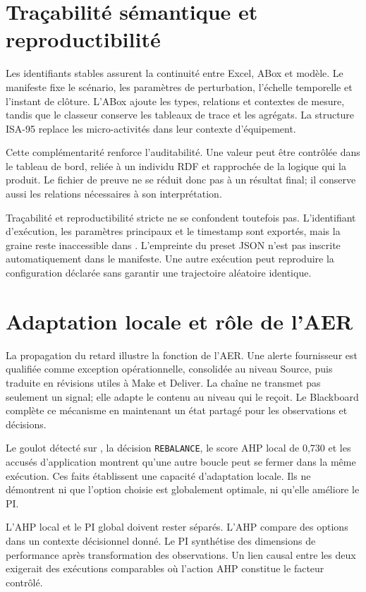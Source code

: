\section{Traçabilité sémantique et reproductibilité}

Les identifiants stables assurent la continuité entre Excel, ABox et modèle. Le manifeste fixe le scénario, les paramètres de perturbation, l'échelle temporelle et l'instant de clôture. L'ABox ajoute les types, relations et contextes de mesure, tandis que le classeur conserve les tableaux de trace et les agrégats. La structure ISA-95 replace les micro-activités dans leur contexte d'équipement.

Cette complémentarité renforce l'auditabilité. Une valeur peut être contrôlée dans le tableau de bord, reliée à un individu RDF et rapprochée de la logique qui la produit. Le fichier de preuve ne se réduit donc pas à un résultat final; il conserve aussi les relations nécessaires à son interprétation.

Traçabilité et reproductibilité stricte ne se confondent toutefois pas. L'identifiant d'exécution, les paramètres principaux et le timestamp sont exportés, mais la graine reste inaccessible dans . L'empreinte du preset JSON n'est pas inscrite automatiquement dans le manifeste. Une autre exécution peut reproduire la configuration déclarée sans garantir une trajectoire aléatoire identique.

\section{Adaptation locale et rôle de l'AER}

La propagation du retard illustre la fonction de l'AER. Une alerte fournisseur est qualifiée comme exception opérationnelle, consolidée au niveau Source, puis traduite en révisions utiles à Make et Deliver. La chaîne ne transmet pas seulement un signal; elle adapte le contenu au niveau qui le reçoit. Le Blackboard complète ce mécanisme en maintenant un état partagé pour les observations et décisions.

Le goulot détecté sur , la décision \texttt{REBALANCE}, le score AHP local de 0,730 et les accusés d'application montrent qu'une autre boucle peut se fermer dans la même exécution. Ces faits établissent une capacité d'adaptation locale. Ils ne démontrent ni que l'option choisie est globalement optimale, ni qu'elle améliore le PI.

L'AHP local et le PI global doivent rester séparés. L'AHP compare des options dans un contexte décisionnel donné. Le PI synthétise des dimensions de performance après transformation des observations. Un lien causal entre les deux exigerait des exécutions comparables où l'action AHP constitue le facteur contrôlé.


